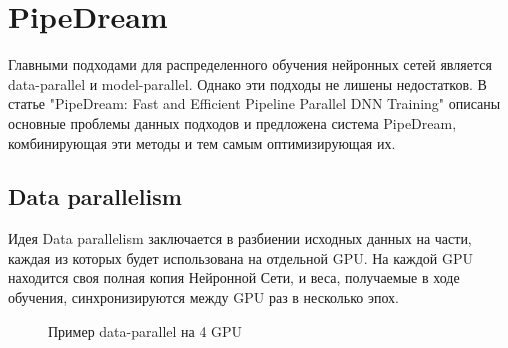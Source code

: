 
\newpage
\section{PipeDream}
\indent\setlength{\parindent}{1em} 
Главными подходами для распределенного обучения нейронных сетей является data-parallel и model-parallel. Однако эти подходы не лишены недостатков. В статье "PipeDream: Fast and Efficient Pipeline Parallel DNN Training" описаны основные проблемы данных подходов и предложена система PipeDream, комбинирующая эти методы и тем самым оптимизирующая их.

\subsection{Data parallelism}
Идея Data parallelism заключается в разбиении исходных данных на части, каждая из которых будет использована на отдельной GPU. На каждой GPU находится своя полная копия Нейронной Сети, и веса, получаемые в ходе обучения, синхронизируются между GPU раз в несколько эпох.
\begin{figure}[h]%
	\centering
	\caption{Пример data-parallel на 4 GPU}
	\label{framework} %
\end{figure}

